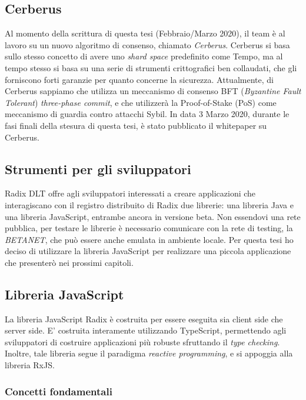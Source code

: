 \subsection{Cerberus}

Al momento della scrittura di questa tesi (Febbraio/Marzo 2020), il team è al lavoro su un nuovo algoritmo di consenso, chiamato \textit{Cerberus}. Cerberus si basa sullo stesso concetto di avere uno \textit{shard space} predefinito come Tempo, ma al tempo stesso si basa su una serie di strumenti crittografici ben collaudati, che gli forniscono forti garanzie per quanto concerne la sicurezza. Attualmente, di Cerberus sappiamo che utilizza un meccanismo di consenso BFT (\textit{Byzantine Fault Tolerant}) \textit{three-phase commit}, e che utilizzerà la Proof-of-Stake (PoS) come meccanismo di guardia contro attacchi Sybil. In data 3 Marzo 2020, durante le fasi finali della stesura di questa tesi, è stato pubblicato il whitepaper su Cerberus. 

\subsection{Strumenti per gli sviluppatori}

Radix DLT offre agli sviluppatori interessati a creare applicazioni che interagiscano con il registro distribuito di Radix due librerie: una libreria Java e una libreria JavaScript, entrambe ancora in versione beta. Non essendovi una rete pubblica, per testare le librerie è necessario comunicare con la rete di testing, la \textit{BETANET}, che può essere anche emulata in ambiente locale. Per questa tesi ho deciso di utilizzare la libreria JavaScript per realizzare una piccola applicazione che presenterò nei prossimi capitoli.

\subsection{Libreria JavaScript}

La libreria JavaScript Radix è costruita per essere eseguita sia client side che server side. E' costruita interamente utilizzando TypeScript, permettendo agli sviluppatori di costruire applicazioni più robuste sfruttando il \textit{type checking}. Inoltre, tale libreria segue il paradigma \textit{reactive programming}, e si appoggia alla libreria RxJS.

\subsubsection{Concetti fondamentali}

